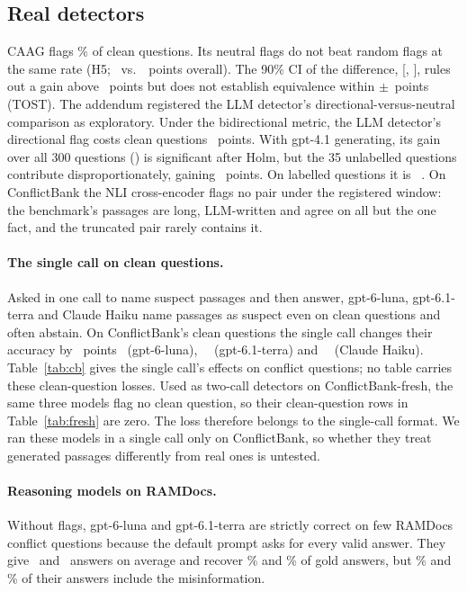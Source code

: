 \subsection{Real detectors}
CAAG flags \cleanFprCaag\% of clean questions. Its neutral flags do not beat random flags at the same rate (H5;
\dCaagFlagAll\ vs.\ \dRandFlagAll\ points overall). The 90\% CI of the difference, [\tostLo, \tostHi], rules out a
gain above \tostHi\ points but does not establish equivalence within $\pm$\tostMargin\ points (TOST). The
addendum registered the LLM detector's directional-versus-neutral comparison as exploratory.
Under the bidirectional metric, the LLM detector's directional flag costs clean questions \arLlmDirClean\ points. With
gpt-4.1 generating, its gain over all 300 questions (\gptLlmDirAll) is significant after Holm, but the 35
unlabelled questions contribute disproportionately, gaining \agptexclLlmDir\ points. On labelled
questions it is \gptlabLlmDir\ \gptlabLlmDirCI. On ConflictBank the NLI cross-encoder flags no pair under the
registered window: the benchmark's passages are long, LLM-written and agree on all but the one fact, and the truncated
pair rarely contains it.

\paragraph{The single call on clean questions.} Asked in one call to name suspect passages and then answer, gpt-6-luna,
gpt-6.1-terra and Claude Haiku name passages as suspect even on clean questions and often abstain. On ConflictBank's
clean questions the single call changes their accuracy by \zSgLunaSelfIdentifyClean\ points
\zSgLunaSelfIdentifyCleanCI\ (gpt-6-luna), \zSgTerraSelfIdentifyClean\ \zSgTerraSelfIdentifyCleanCI\ (gpt-6.1-terra)
and \zSgHaikuSelfIdentifyClean\ \zSgHaikuSelfIdentifyCleanCI\ (Claude Haiku). Table~\ref{tab:cb} gives the single
call's effects on conflict questions; no table carries these clean-question losses. Used as two-call detectors on
ConflictBank-fresh, the same three models flag no clean question, so their clean-question rows in
Table~\ref{tab:fresh} are zero. The loss therefore belongs to the single-call format. We ran these models in a single
call only on ConflictBank, so whether they treat generated passages differently from real ones is untested.

\paragraph{Reasoning models on RAMDocs.} Without flags, gpt-6-luna and gpt-6.1-terra are
strictly correct on few RAMDocs conflict questions because the default prompt asks for every valid answer. They give
\mixRdLunaNAnswers\ and \mixRdTerraNAnswers\ answers on average and recover \mixRdLunaRecall\% and
\mixRdTerraRecall\% of gold answers, but \mixRdLunaMisinfo\% and \mixRdTerraMisinfo\% of their answers include
the misinformation.

